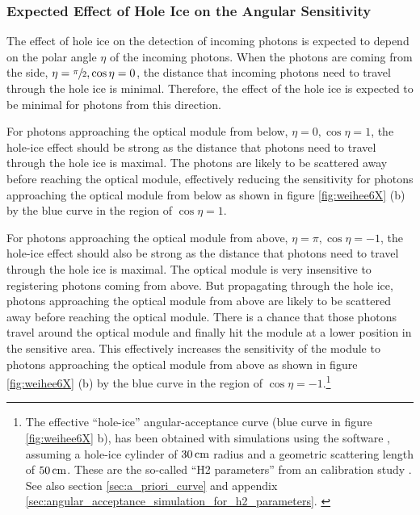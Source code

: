 \FloatBarrier
\subsubsection{Expected Effect of Hole Ice on the Angular Sensitivity}
\label{sec:hole_ice_effects}

The effect of hole ice on the detection of incoming photons is expected
to depend on the polar angle \(\eta\) of the incoming photons.
\cite{icepaper} When the photons are coming from the side,
\(\eta = \sfrac{\pi}{2}, \cos \eta = 0\), the distance that incoming
photons need to travel through the hole ice is minimal. Therefore, the
effect of the hole ice is expected to be minimal for photons from this
direction.

For photons approaching the optical module from below,
\(\eta = 0, \cos \eta = 1\), the hole-ice effect should be strong as the
distance that photons need to travel through the hole ice is maximal.
The photons are likely to be scattered away before reaching the optical
module, effectively reducing the sensitivity for photons approaching the
optical module from below as shown in figure \ref{fig:weihee6X} (b) by
the blue curve in the region of \(\cos \eta = 1\).

For photons approaching the optical module from above,
\(\eta = \pi, \cos \eta = -1\), the hole-ice effect should also be
strong as the distance that photons need to travel through the hole ice
is maximal. The optical module is very insensitive to registering
photons coming from above. But propagating through the hole ice, photons
approaching the optical module from above are likely to be scattered
away before reaching the optical module. There is a chance that those
photons travel around the optical module and finally hit the module at a
lower position in the sensitive area. This effectively increases the
sensitivity of the module to photons approaching the optical module from
above as shown in figure \ref{fig:weihee6X} (b) by the blue curve in the
region of
\(\cos \eta = -1\).\footnote{The effective ``hole-ice'' angular-acceptance curve (blue curve in figure \ref{fig:weihee6X} b), has been obtained with simulations using the  software \cite{lundberg}, assuming a hole-ice cylinder of $30\text{\,cm}$ radius and a geometric scattering length of $50\text{\,cm}$. These are the so-called ``H2 parameters'' from an  calibration study \cite{holeicestudieswithyag,icemodelsdata}. See also section \ref{sec:a_priori_curve} and appendix \ref{sec:angular_acceptance_simulation_for_h2_parameters}. \label{footnote:hole_ice_h2_curve}}

